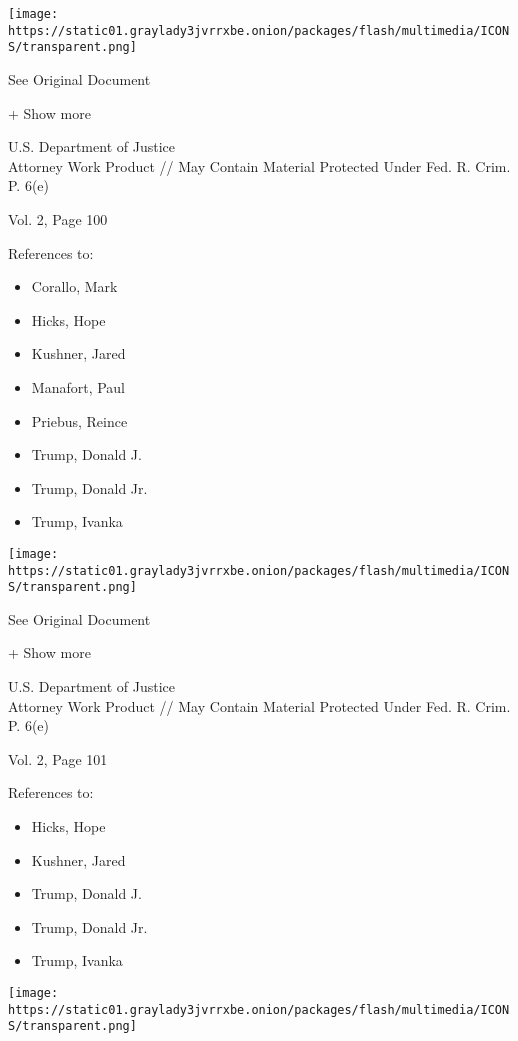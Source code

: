 \protect\hyperlink{}{}

\texttt{[image: https://static01.graylady3jvrrxbe.onion/packages/flash/multimedia/ICONS/transparent.png]}

See Original Document

+ Show more

U.S. Department of Justice\\
Attorney Work Product // May Contain Material Protected Under Fed. R.
Crim. P. 6(e)

Vol. 2, Page 100

References to:

\begin{itemize}
\tightlist
\item
  Corallo, Mark
\item
  Hicks, Hope
\item
  Kushner, Jared
\item
  Manafort, Paul 
\item
  Priebus, Reince
\item
  Trump, Donald J.
\item
  Trump, Donald Jr.
\item
  Trump, Ivanka
\end{itemize}

\protect\hyperlink{}{}

\texttt{[image: https://static01.graylady3jvrrxbe.onion/packages/flash/multimedia/ICONS/transparent.png]}

See Original Document

+ Show more

U.S. Department of Justice\\
Attorney Work Product // May Contain Material Protected Under Fed. R.
Crim. P. 6(e)

Vol. 2, Page 101

References to:

\begin{itemize}
\tightlist
\item
  Hicks, Hope
\item
  Kushner, Jared
\item
  Trump, Donald J.
\item
  Trump, Donald Jr.
\item
  Trump, Ivanka
\end{itemize}

\protect\hyperlink{}{}

\texttt{[image: https://static01.graylady3jvrrxbe.onion/packages/flash/multimedia/ICONS/transparent.png]}


